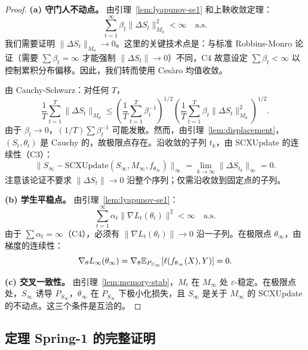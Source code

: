 \begin{proof}
\textbf{(a) 守门人不动点。} 由引理~\ref{lem:lyapunov-se1} 和上鞅收敛定理：
\begin{equation}
    \sum_{t=1}^\infty \beta_t \|\Delta S_t\|_{M_0}^2 < \infty \quad \text{a.s.}
\end{equation}
我们需要证明 $\|\Delta S_t\|_{M_0} \to 0$。这里的关键技术点是：与标准 Robbins-Monro 论证（需要 $\sum \beta_t = \infty$ 才能强制 $\|\Delta S_t\| \to 0$）不同，C4 故意设定 $\sum \beta_t < \infty$ 以控制累积分布偏移。因此，我们转而使用 Ces\`{a}ro 均值收敛。

由 Cauchy-Schwarz：对任何 $T$，
\begin{equation}
    \frac{1}{T}\sum_{t=1}^{T}\|\Delta S_t\|_{M_0} \leq \left(\frac{1}{T}\sum_{t=1}^{T}\beta_t^{-1}\right)^{1/2} \left(\frac{1}{T}\sum_{t=1}^{T}\beta_t \|\Delta S_t\|_{M_0}^2\right)^{1/2}.
\end{equation}
由于 $\beta_t \to 0$，$(1/T)\sum \beta_t^{-1}$ 可能发散。然而，由引理~\ref{lem:displacement}，$(S_t, \theta_t)$ 是 Cauchy 的，故极限点存在。沿收敛的子列 $t_k$，由 SCXUpdate 的连续性（C3）：
\begin{equation}
    \|S_\infty - \text{SCXUpdate}(S_\infty, M_\infty, f_{\theta_\infty})\|_\infty = \lim_{k \to \infty} \|\Delta S_{t_k}\|_\infty = 0.
\end{equation}
注意该论证不要求 $\|\Delta S_t\| \to 0$ 沿整个序列；仅需沿收敛到固定点的子列。

\textbf{(b) 学生平稳点。} 由引理~\ref{lem:lyapunov-se1}：
\begin{equation}
    \sum_{t=1}^\infty \alpha_t \|\nabla L_t(\theta_t)\|^2 < \infty \quad \text{a.s.}
\end{equation}
由于 $\sum \alpha_t = \infty$（C4），必须有 $\|\nabla L_t(\theta_t)\| \to 0$ 沿一子列。在极限点 $\theta_\infty$，由梯度的连续性：
\begin{equation}
    \nabla_\theta L_\infty(\theta_\infty) = \nabla_\theta \mathbb{E}_{P_{S_\infty}}[\ell(f_{\theta_\infty}(X), Y)] = 0.
\end{equation}

\textbf{(c) 交叉一致性。} 由引理~\ref{lem:memory-stab}，$M_t$ 在 $M_\infty$ 处 $\varepsilon$-稳定。在极限点处，$S_\infty$ 诱导 $P_{S_\infty}$，$\theta_\infty$ 在 $P_{S_\infty}$ 下极小化损失，且 $S_\infty$ 是关于 $M_\infty$ 的 SCXUpdate 的不动点。这三个条件是互洽的。
\end{proof}

\subsection{定理 Spring-1 的完整证明}

